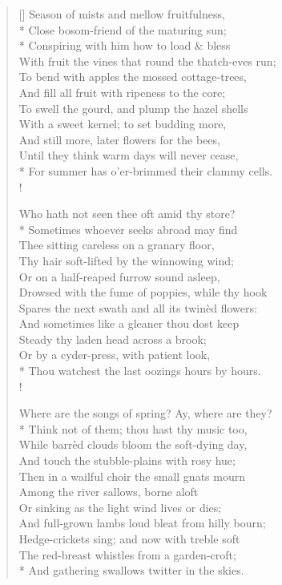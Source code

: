 \documentclass[MAIN]{subfiles}
\begin{document}
\settowidth{\versewidth}{Season of mists and mellow fruitfulness,}
\begin{verse}[\versewidth]
Season of mists and mellow fruitfulness,\\*
\vin Close bosom-friend of the maturing sun;\\*
Conspiring with him how to load \& bless\\
\vin With fruit the vines that round the thatch-eves run;\\
To bend with apples the mossed cottage-trees,\\
\vin And fill all fruit with ripeness to the core;\\
\vin \vin To swell the gourd, and plump the hazel shells\\
\vin With a sweet kernel; to set budding more,\\
And still more, later flowers for the bees,\\
Until they think warm days will never cease,\\*
\vin \vin For summer has o'er-brimmed their clammy cells.\\!

Who hath not seen thee oft amid thy store?\\*
\vin Sometimes whoever seeks abroad may find\\
Thee sitting careless on a granary floor,\\
\vin Thy hair soft-lifted by the winnowing wind;\\
Or on a half-reaped furrow sound asleep,\\
\vin Drowsed with the fume of poppies, while thy hook\\
\vin \vin Spares the next swath and all its twin\`ed flowers:\\
And sometimes like a gleaner thou dost keep\\
\vin Steady thy laden head across a brook;\\
\vin Or by a cyder-press, with patient look,\\*
\vin \vin Thou watchest the last oozings hours by hours.\\!

Where are the songs of spring? Ay, where are they?\\*
\vin Think not of them; thou hast thy music too,\\
While barr\`ed clouds bloom the soft-dying day,\\
\vin And touch the stubble-plains with rosy hue;\\
Then in a wailful choir the small gnats mourn\\
\vin Among the river sallows, borne aloft\\
\vin \vin Or sinking as the light wind lives or dies;\\
And full-grown lambs loud bleat from hilly bourn;\\
\vin Hedge-crickets sing; and now with treble soft\\
\vin The red-breast whistles from a garden-croft;\\*
And gathering swallows twitter in the skies.
\end{verse}
\end{document}
